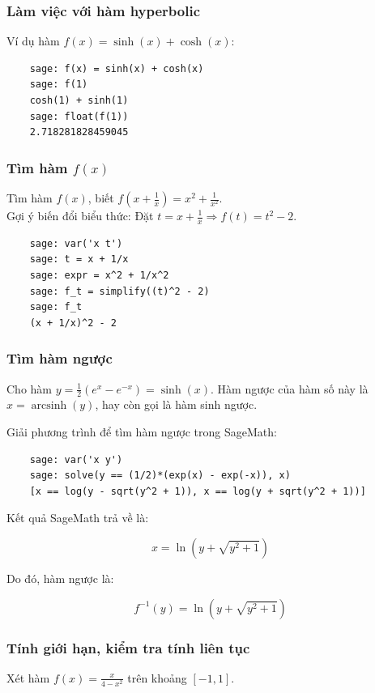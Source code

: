 \subsubsection{Làm việc với hàm hyperbolic}
Ví dụ hàm \( f(x) = \sinh(x) + \cosh(x) \):
\begin{lstlisting}
	sage: f(x) = sinh(x) + cosh(x)
	sage: f(1)
	cosh(1) + sinh(1)
	sage: float(f(1))
	2.718281828459045
\end{lstlisting}

\subsubsection{Tìm hàm \( f(x) \)}
Tìm hàm $f(x)$, biết \( f(x + \frac{1}{x}) = x^2 + \frac{1}{x^2} \).\\

Gợi ý biến đổi biểu thức: Đặt \( t = x + \frac{1}{x} \Rightarrow f(t) = t^2 - 2 \).
\begin{lstlisting}
	sage: var('x t')
	sage: t = x + 1/x
	sage: expr = x^2 + 1/x^2
	sage: f_t = simplify((t)^2 - 2)
	sage: f_t
	(x + 1/x)^2 - 2
\end{lstlisting}

\subsubsection{Tìm hàm ngược}

Cho hàm \( y = \frac{1}{2}(e^x - e^{-x}) = \sinh(x) \). Hàm ngược của hàm số này là \( x = \operatorname{arcsinh}(y) \), hay còn gọi là hàm sinh ngược.

Giải phương trình để tìm hàm ngược trong SageMath:

\begin{lstlisting}
	sage: var('x y')
	sage: solve(y == (1/2)*(exp(x) - exp(-x)), x)
	[x == log(y - sqrt(y^2 + 1)), x == log(y + sqrt(y^2 + 1))]
\end{lstlisting}

Kết quả SageMath trả về là:

\[
x = \ln\left( y + \sqrt{y^2 + 1} \right)
\]

Do đó, hàm ngược là:

\[
\boxed{f^{-1}(y) = \ln\left( y + \sqrt{y^2 + 1} \right)}
\]

\subsubsection{Tính giới hạn, kiểm tra tính liên tục}
Xét hàm \( f(x) = \frac{x}{4 - x^2} \) trên khoảng \( [-1,1] \).

